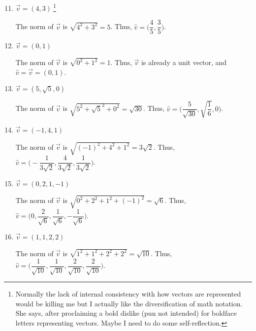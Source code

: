 \documentclass{article}
\begin{document}
\begin{enumerate}
    \setcounter{enumi}{10} 
    \item \(\overrightarrow{v} = (4,3)~\)\footnote{Normally the lack of internal consistency with how vectors are represented would be killing me but I actually like the diversification of math notation. She says, after proclaiming a bold dislike (pun not intended)
    for boldface letters representing vectors. Maybe I need to do some self-reflection.}\begin{solution}
        The norm of \(\overrightarrow{v}\) is \(\sqrt{4^2 + 3^2} = 5\). Thus, \(\hat{v} = \biggl(\dfrac{4}{5}, \dfrac{3}{5}\biggl)\). 
    \end{solution}
    \item \(\overrightarrow{v} = (0,1)\)\begin{solution}
        The norm of \(\overrightarrow{v}\) is \(\sqrt{0^2 + 1^2} = 1\). Thus, \(\overrightarrow{v}\) is already a unit vector, and \(\hat{v} = \overrightarrow{v} = (0,1)\). 
    \end{solution}
    \item \(\overrightarrow{v} = (5,\sqrt{5},0)\)\begin{solution}
        The norm of \(\overrightarrow{v}\) is \(\sqrt{5^2 + {\sqrt{5}}^2 + 0^2} = \sqrt{30}\). Thus, \(\hat{v} = \biggl(\dfrac{5}{\sqrt{30}}, \sqrt{\dfrac{1}{6}}, 0\biggl)\). 
    \end{solution}
    \item \(\overrightarrow{v} = (-1,4,1)\)\begin{solution}
        The norm of \(\overrightarrow{v}\) is \(\sqrt{{(-1)}^2 + 4^2+ 1^2} = 3\sqrt{2}\). Thus, \(\hat{v} = \biggl(-\dfrac{1}{3\sqrt{2}}, \dfrac{4}{3\sqrt{2}}, \dfrac{1}{3\sqrt{2}}\biggl)\). 
    \end{solution}
    \item \(\overrightarrow{v} = (0,2,1,-1)\)\begin{solution}
        The norm of \(\overrightarrow{v}\) is \(\sqrt{0^2 + 2^2 + 1^2 + {(-1)}^2} = \sqrt{6}\). Thus, \(\hat{v} = \biggl(0, \dfrac{2}{\sqrt{6}}, \dfrac{1}{\sqrt{6}}, -\dfrac{1}{\sqrt{6}}\biggl)\). 
    \end{solution}
    \item \(\overrightarrow{v} = (1,1,2,2)\)\begin{solution}
        The norm of \(\overrightarrow{v}\) is \(\sqrt{1^2 + 1^2 + 2^2 + 2^2} = \sqrt{10}\). Thus, \(\hat{v} = \biggl(\dfrac{1}{\sqrt{10}}, \dfrac{1}{\sqrt{10}}, \dfrac{2}{\sqrt{10}}, \dfrac{2}{\sqrt{10}}\biggl)\).
    \end{solution}
\end{enumerate}
\end{document}

